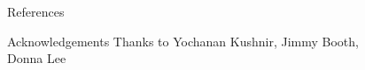 \documentclass[serif,mathserif,final]{beamer}
\title{}
\author{James Doss-Gollin\inst{1,2} \quad David Farnham\inst{1,2} \quad Upmanu Lall\inst{1,2}}
\institute
{\inst{1} Columbia Water Center \quad \inst{2} Department of Earth and Environmental Engineering, Columbia University}
\begin{document}
\begin{frame}{}
  \begin{columns}[t]

    \begin{column}{0.22\linewidth}

        
        
        

    \end{column}%

    \begin{column}{0.22\linewidth}

        

    \end{column}%

    \begin{column}{0.22\linewidth}

      

    \end{column}%


    \begin{column}{0.22\linewidth}

      \begin{block}{References}
          \renewcommand*{\bibfont}{\footnotesize}
          \printbibliography[heading=none]
      \end{block}

      \begin{block}{Acknowledgements}
          Thanks to Yochanan Kushnir, Jimmy Booth, Donna Lee
      \end{block}

    \end{column}%

  \end{columns}
\end{frame}
\end{document}
